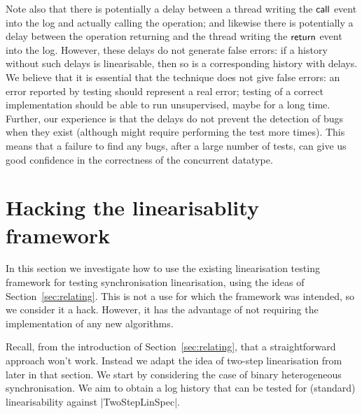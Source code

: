 Note also that there is potentially a delay between a thread writing the
$\mathsf{call}$ event into the log and actually calling the operation; and likewise
there is potentially a delay between the operation returning and the thread
writing the $\mathsf{return}$ event into the log.  However, these delays do not
generate false errors: if a history without such delays is linearisable, then
so is a corresponding history with delays.  We believe that it is essential
that the technique does not give false errors: an error reported by testing
should represent a real error; testing of a correct implementation should be
able to run unsupervised, maybe for a long time.  Further, our experience is
that the delays do not prevent the detection of bugs when they exist (although
might require performing the test more times).  This means that a failure to
find any bugs, after a large number of tests, can give us good confidence in
the correctness of the concurrent datatype.



\section{Hacking the linearisablity framework}
\label{sec:testing-hacking}


In this section we investigate how to use the existing linearisation testing
framework for testing synchronisation linearisation, using the ideas of
Section~\ref{sec:relating}.  This is not a use for which the framework
was intended, so we consider it a hack.  However, it has the advantage of not
requiring the implementation of any new algorithms.

Recall, from the introduction of Section~\ref{sec:relating}, that a
straightforward approach won't work.  Instead we adapt the idea of two-step
linearisation from later in that section.  We start by considering the case of
binary heterogeneous synchronisation.  We aim to obtain a log history that can
be tested for (standard) linearisability against |TwoStepLinSpec|.

